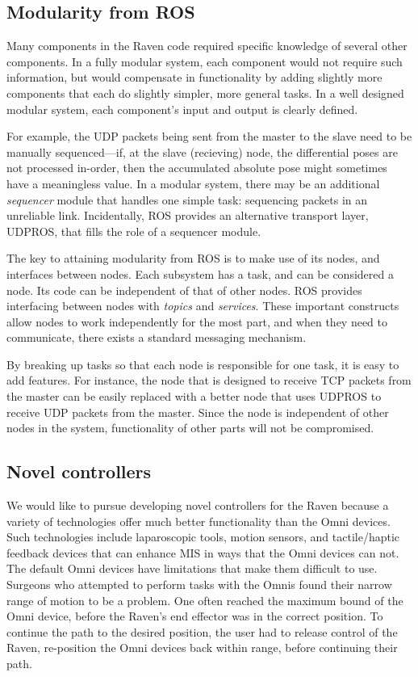 \documentclass[letterpaper,twocolumn,10pt]{article}
\begin{document}
\subsection{Modularity from ROS}

Many components in the Raven code required specific knowledge of
several other components. In a fully modular system, each component
would not require such information, but would compensate in
functionality by adding slightly more components that each do slightly
simpler, more general tasks. In a well designed modular system, each
component's input and output is clearly defined.

For example, the UDP packets being sent from the master to the slave
need to be manually sequenced---if, at the slave (recieving) node, the
differential poses are not processed in-order, then the accumulated
absolute pose might sometimes have a meaningless value. In a modular
system, there may be an additional \emph{sequencer} module that
handles one simple task: sequencing packets in an unreliable
link. Incidentally, ROS provides an alternative transport layer, 
UDPROS, that fills the role of a sequencer module.

The key to attaining modularity from ROS is to make use of its nodes, 
and interfaces between nodes. Each subsystem has a task, and can be 
considered a node. Its code can be independent of that of other nodes. 
ROS provides interfacing between nodes with \emph{topics} and 
\emph{services}. These important constructs allow nodes to work 
independently for the most part, and when they need to communicate, 
there exists a standard messaging mechanism.

By breaking up tasks so that each node is responsible for one task, 
it is easy to add features. For instance, the node that is designed 
to receive TCP packets from the master can be easily replaced with 
a better node that uses UDPROS to receive UDP packets from the master. 
Since the node is independent of other nodes in the system, 
functionality of other parts will not be compromised.


\subsection{Novel controllers}
We would like to pursue developing novel controllers for the Raven
because a variety of technologies offer much better functionality than
the Omni devices. Such technologies include laparoscopic tools, motion
sensors, and tactile/haptic feedback devices that can enhance MIS in
ways that the Omni devices can not.  The default Omni devices have
limitations that make them difficult to use. Surgeons who attempted to
perform tasks with the Omnis found their narrow range of motion to be
a problem. One often reached the maximum bound of the Omni device,
before the Raven's end effector was in the correct position. To
continue the path to the desired position, the user had to release
control of the Raven, re-position the Omni devices back within range,
before continuing their path.
\end{document}
